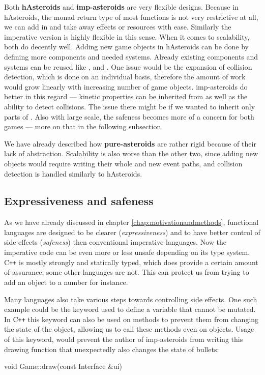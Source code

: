 \documentclass[
  digital, %
  color,   %
  table,   %
  oneside, %
  lof,     %
  lot,     %
]{fithesis3}
\newcommand{\cpp}{C\nolinebreak\texttt{+}\nolinebreak\texttt{+}}
\begin{document}
{Both \textbf{hAsteroids} and \textbf{imp-asteroids} are very flexible designs.
Because in hAsteroids, the monad return type of most functions is not very
restrictive at all, we can add in and take away effects or resources with ease.
Similarly the imperative version is highly flexible in this sense. When it comes
to scalability, both do decently well. Adding new game objects in hAsteroids can be done by
defining more components and needed systems. Already existing components and systems can be reused
like ,  and .
One issue would be the expansion of collision detection,
which is done on an individual basis, therefore the amount of work
would grow linearly with increasing number of game objects.
imp-asteroids do better in this regard --- kinetic properties can
be inherited from  as well as the ability to detect collisions.
The issue there might be if we wanted to inherit only parts of .
Also with large scale, the safeness becomes more of a concern for both games
--- more on that in the following subsection.

We have already described how \textbf{pure-asteroids} are rather rigid because of
their lack of abstraction. Scalability is also worse than the other two, since
adding new objects would require writing their whole  and
new event paths, and collision detection is handled similarly to hAsteroids.



\subsection{Expressiveness and safeness}

As we have already discussed in chapter \ref{chap:motivationandmethods},
functional languages are designed to be clearer (\emph{expressiveness})
and to have better control of side effects (\emph{safeness}) then conventional
imperative languages. Now the imperative code can be even more or less unsafe
depending on its type system. \cpp{} is mostly strongly and statically typed, which
does provide a certain amount of assurance, some other languages are not.
This can protect us from trying to add an object to a number for instance.

Many languages also take various steps towards controlling side effects.
One such example could be the  keyword used to define a variable
that cannot be mutated. In \cpp{} this keyword can also be used on methods
to prevent them from changing the state of the object, allowing us to call these
methods even on  objects. Usage of this keyword, would prevent
the author of imp-asteroids from writing this drawing function that
unexpectedly also changes the state of bullets:
\begin{cppblock}
void Game::draw(const Interface &ui) {

}
\end{cppblock}}
\end{document}
